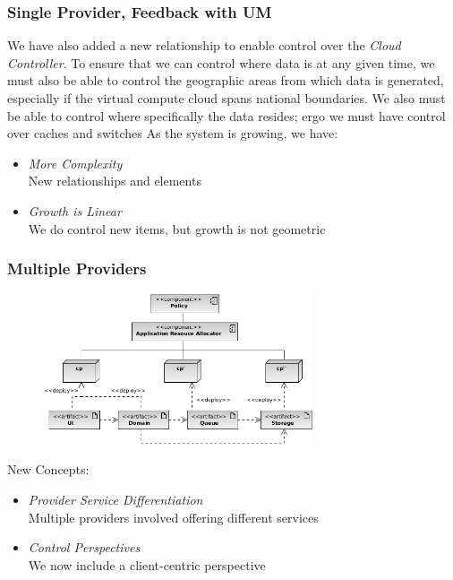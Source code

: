 \documentclass[t, 10pt]{beamer}
\begin{document}
\begin{frame}
\frametitle{Single Provider, Feedback with UM}
We have also added a new relationship to enable control over the \textit{Cloud Controller}.  To ensure that we can control where data is at any given time, we must also be able to control the geographic areas from which data is generated, especially if the virtual compute cloud spans national boundaries.
\newline
\newline
We also must be able to control where specifically the data resides; ergo we must have control over caches and switches
\newline
\newline
As the system is growing, we have:
\begin{itemize}
\item \textit{More Complexity} \\
New relationships and elements
\item \textit{Growth is Linear} \\
We do control new items, but growth is not geometric
\end{itemize}

\end{frame}

\begin{frame}
\frametitle{Multiple Providers}

\begin{figure}
\includegraphics[width = 8cm]{Multiple}
\end{figure}

New Concepts:
\begin{itemize}
\item \textit{Provider Service Differentiation} \\
Multiple providers involved offering different services
\item \textit{Control Perspectives} \\
We now include a client-centric perspective
\end{itemize}

\end{frame}
\end{document}
